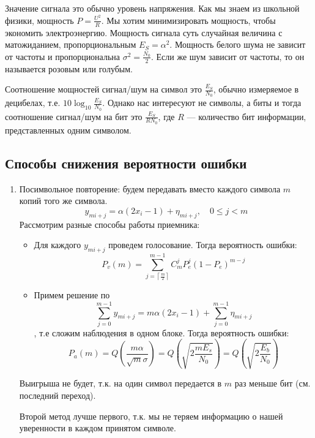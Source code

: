 Значение сигнала это обычно уровень напряжения.
Как мы знаем из школьной физики, мощность \(P = \frac{U^2}{R}\).
Мы хотим минимизировать мощность, чтобы экономить электроэнергию.
Мощность сигнала суть случайная величина с матожиданием, пропорциональным \(E_S = \alpha^2\).
Мощность белого шума не зависит от частоты и пропорциональна \(\sigma^2 = \frac{N_0}{2}\).
Если же шум зависит от частоты, то он называется розовым или голубым.

Соотношение мощностей сигнал/шум на символ это \(\frac{E_S}{N_0}\), обычно измеряемое в децибелах, т.е. \(10 \log_{10} \frac{E_S}{N_0}\).
Однако нас интересуют не символы, а биты и тогда соотношение сигнал/шум на бит это \(\frac{E_S}{RN_0}\),
где \(R\) --- количество бит информации, представленных одним символом.

\subsection{Способы снижения вероятности ошибки}

\begin{enumerate}
    \item Посимвольное повторение: будем передавать вместо каждого символа \(m\) копий того же символа.
          \[y_{mi + j} = \alpha (2x_i - 1) + \eta_{mi + j}, \quad 0 \le j < m\]
          Рассмотрим разные способы работы приемника:
          \begin{itemize}
              \item  Для каждого \(y_{mi + j}\) проведем голосование. Тогда вероятность ошибки:
                    \[P_v(m) = \sum_{j = \left\lceil \frac{m}{2} \right\rceil }^{m - 1} C_m^j P_e^j (1 - P_e)^{m - j}\]
              \item Примем решение по
                    \[\sum_{j = 0}^{m - 1} y_{mi + j} = m \alpha(2 x_i - 1) + \sum_{j = 0}^{m - 1} \eta_{mi + j}\]
                    , т.е сложим наблюдения в одном блоке. Тогда вероятность ошибки:
                    \[P_a(m) = Q\left(\frac{m \alpha}{\sqrt{m} \sigma }\right) = Q \left( \sqrt{2 \frac{m E_s}{N_0}} \right) = Q \left( \sqrt{2 \frac{E_b}{N_0}} \right)\]
          \end{itemize}
          Выигрыша не будет, т.к. на один символ передается в \(m\) раз меньше бит (см. последний переход).

          Второй метод лучше первого, т.к. мы не теряем информацию о нашей уверенности в каждом принятом символе.
\end{enumerate}

